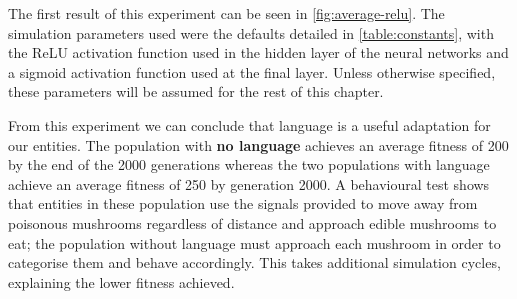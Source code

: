 \documentclass[12pt,a4paper]{report}
\begin{document}
The first result of this experiment can be seen in \cref{fig:average-relu}. The simulation parameters used were the defaults detailed in \cref{table:constants}, with the ReLU activation function used in the hidden layer of the neural networks and a sigmoid activation function used at the final layer. Unless otherwise specified, these parameters will be assumed for the rest of this chapter.

From this experiment we can conclude that language is a useful adaptation for our entities. The population with {\bf no language} achieves an average fitness of 200 by the end of the 2000 generations whereas the two populations with language achieve an average fitness of 250 by generation 2000. A behavioural test shows that entities in these population use the signals provided to move away from poisonous mushrooms regardless of distance and approach edible mushrooms to eat; the population without language must approach each mushroom in order to categorise them and behave accordingly. This takes additional simulation cycles, explaining the lower fitness achieved.
\end{document}
